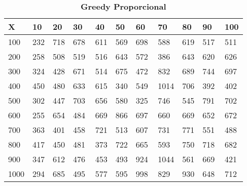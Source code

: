 \documentclass[10pt,letterpaper]{article}
\begin{document}
\begin{center}
\begin{table}\renewcommand{\arraystretch}{2.5}
\caption{\large \textbf{Greedy Proporcional}}
\centering
\begin{tabular} { |m{0.5cm}|m{1.3cm}|m{1.3cm}|m{1.3cm}|m{1.3cm}|m{1.3cm}|m{1.3cm}|m{1.3cm}|m{1.3cm}|m{1.3cm}|m{1.3cm}|} 
\hline
\rowcolor{Gray}
\centering \textbf{X} & \centering \textbf{10} & \centering \textbf{20} & \centering \textbf{30}\ & \centering \textbf{40} & \centering \textbf{50} & \centering \textbf{60}\ & \centering \textbf{70} & \centering \textbf{80} & \centering \textbf{90}\ & \textbf{100} \\\hline
\cellcolor{Gray}100 & \Large 232 & \Large 718 & \Large 678 & \Large 611 & \Large 569 & \Large 698 & \Large 588 & \Large 619 & \Large 517 & \Large 511 \\
\hline
\cellcolor{Gray}200 & \Large 258 & \Large 508 & \Large 519 & \Large 516 & \Large 643 & \Large 572 & \Large 386 & \Large 643 & \Large 620 & \Large 626 \\
\hline
\cellcolor{Gray}300 & \Large 324 & \Large 428 & \Large 671 & \Large 514 & \Large 675 & \Large 472 & \Large 832 & \Large 689 & \Large 744 & \Large 697 \\
\hline
\cellcolor{Gray}400 & \Large 450 & \Large 480 & \Large 633 & \Large 615 & \Large 340 & \Large 549 & \Large 1014 & \Large 706 & \Large 392 & \Large 402 \\
\hline
\cellcolor{Gray}500 & \Large 302 & \Large 447 & \Large 703 & \Large 656 & \Large 580 & \Large 325 & \Large 746 & \Large 545 & \Large 791 & \Large 702 \\
\hline
\cellcolor{Gray}600 & \Large 255 & \Large 654 & \Large 484 & \Large 669 & \Large 866 & \Large 697 & \Large 660 & \Large 669 & \Large 652 & \Large 672 \\
\hline
\cellcolor{Gray}700 & \Large 363 & \Large 401 & \Large 458 & \Large 721 & \Large 513 & \Large 607 & \Large 731 & \Large 771 & \Large 551 & \Large 488 \\
\hline
\cellcolor{Gray}800 & \Large 417 & \Large 450 & \Large 481 & \Large 373 & \Large 722 & \Large 665 & \Large 593 & \Large 750 & \Large 718 & \Large 682 \\
\hline
\cellcolor{Gray}900 & \Large 347 & \Large 612 & \Large 476 & \Large 453 & \Large 493 & \Large 924 & \Large 1044 & \Large 561 & \Large 669 & \Large 421 \\
\hline
\cellcolor{Gray}1000 & \Large 294 & \Large 685 & \Large 495 & \Large 577 & \Large 595 & \Large 998 & \Large 829 & \Large 930 & \Large 648 & \Large 712 \\
\hline
\end{tabular} \\
\end{table}
\end{center}
\end{document}
